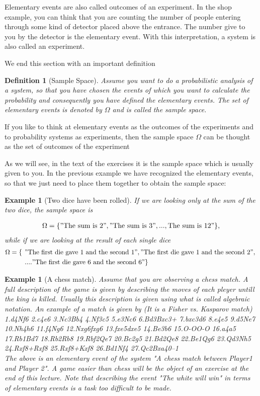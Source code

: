 \documentclass[12pt]{article}
\newtheorem{definition}[theorem]{Definition}
\newtheorem{example}[theorem]{Example}
\newcommand{\<}{{\langle \!\! \langle}}
\renewcommand{\>}{{\rangle \!\! \rangle}}
\newcommand{\bel}[2]{\begin{equation} \label{#1} \begin{split} #2
 					\end{split} \end{equation}}
\newcommand{\commento}[1]{
	\par\noindent
	\colorbox{light}{\begin{minipage}{120 mm}#1\end{minipage}}
	\par\noindent
}
\begin{document}
\commento{ Elementary events are also called outcomes of an experiment. In the shop example, you can think that you are counting the number of people entering through some kind of detector placed above the entrance. The number give to you by the detector is the elementary event. With this interpretation, a system is also called an experiment. }

We end this section with an important definition
\begin{definition}[Sample Space]
Assume you want to do a probabilistic analysis of a system, so that you have chosen the events of which you want to calculate the probability and consequently you have defined the elementary events. The set of elementary events is denoted by $\Omega$ and is called the sample space.
\end{definition}

\commento{If you like to think at elementary events as the outcomes of the experiments and to probability systems as experiments, then the sample space $\Omega$ can be thought as the set of outcomes of the experiment} 
As we will see, in the text of the exercises it is the sample space which is usually given to you. 
In the previous example we have recognized the elementary events, so that we just need to place them together to obtain the sample space: 

\begin{example}[Two dice have been rolled]
If we are looking only at the sum of the two dice, the sample space is 

\bel{}{ \Omega=\{ " \textrm{The sum is 2}"," \textrm{The sum is 3}",..., \textrm{The sum is 12}"\},
}
while if we are looking at the result of each single dice 
\bel{}{
	\Omega  =  \left\{ \right. & \left. " \textrm{The first die gave 1 and the second 1}"," \textrm{The first die gave 1 and the second 2}", \right. \\
	& \left. ...." \textrm{The first die gave 6 and the second 6}"\right\}
} 
\end{example}



\begin{example}[A chess match]
Assume that you are observing a chess match. A full description of the game is given by describing the moves of each pleyer untill the king is killed. Usually this description is given using what is called algebraic notation. An example of a match is given by (It is a Fisher vs. Kasparov match) \\
1.d4Nf6 2.c4e6 3.Nc3Bb4 4.Nf3c5 5.e3Nc6 6.Bd3Bxc3+ 7.bxc3d6 8.e4e5 9.d5Ne7 10.Nh4h6 11.f4Ng6 12.Nxg6fxg6 13.fxe5dxe5 14.Be3b6 15.O-OO-O 16.a4a5 17.Rb1Bd7 18.Rb2Rb8 19.Rbf2Qe7 20.Bc2g5 21.Bd2Qe8 22.Be1Qg6 23.Qd3Nh5 24.Rxf8+Rxf8 25.Rxf8+Kxf8 26.Bd1Nf4 27.Qc2Bxa40–1\\
	The above is an elementary event of the system "A chess match between Player1 and Player 2". A game easier than chess will be the object of an exercise at the end of this lecture. Note that describing the event "The white will win" in terms of elementary events is a task too difficult to be made.   

\end{example}
\end{document}
